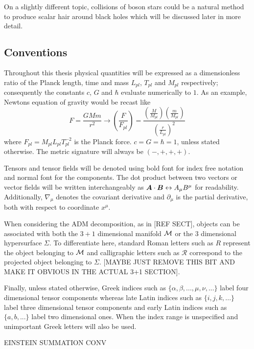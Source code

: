 On a slightly different topic, collisions of boson stars could be a natural method to produce scalar hair around black holes which will be discussed later in more detail. 

\subsection{Conventions}
Throughout this thesis physical quantities will be expressed as a dimensionless ratio of the Planck length, time and mass $L_{pl}$, $T_{pl}$ and $M_{pl}$ respectively; consequently the constants $c$, $G$ and $\hbar$ evaluate numerically to $1$. As an example, Newtons equation of gravity would be recast like
\begin{equation}
F = \frac{G M m}{r^2} \rightarrow \left(\frac{F}{F_{pl}} \right)=\frac{\left(\frac{M}{M_{pl}} \right)\left(\frac{m}{M_{pl}} \right)  }{\left(\frac{r}{L_{pl}} \right)^2}
\end{equation}
where $F_{pl} = M_{pl}L_{pl}T_{pl}^{-2}$ is the Planck force.
$c=G=\hbar=1$, unless stated otherwise. The metric signature will always be $(-,+,+,+)$. 

Tensors and tensor fields will be denoted using bold font for
index free notation and normal font for the components.
The dot product between two vectors or vector fields will be written interchangeably as $\boldsymbol{A} \cdot \boldsymbol{B} \leftrightarrow {A}_\mu {B}^\mu$ for readability.
Additionally, $\nabla_\mu$ denotes the covariant derivative and $\partial_\mu$
is the partial derivative, both with respect to coordinate $x^\mu$.

When considering the ADM decomposition, as in [REF SECT], objects can be associated with both the $3+1$ dimensional manifold $\mathcal{M}$ or the $3$ dimensional hypersurface $\Sigma$. To differentiate here, standard Roman letters such as $R$ represent the object belonging to $\mathcal{M}$ and calligraphic letters such as $\mathcal{R}$ correspond to the projected object belonging to $\Sigma$. [MAYBE JUST REMOVE THIS BIT AND MAKE IT OBVIOUS IN THE ACTUAL 3+1 SECTION].

Finally, unless stated otherwise, Greek indices such
as $\{\alpha, \beta, ..., \mu, \nu, ...\}$ label four dimensional tensor components whereas late Latin indices such as $\{i, j, k, ...\}$ label
three dimensional tensor components and early Latin indices such as $\{a, b, ...\}$ label two dimensional ones. When the index range is unspecified and unimportant Greek letters will also be used.

EINSTEIN SUMMATION CONV

